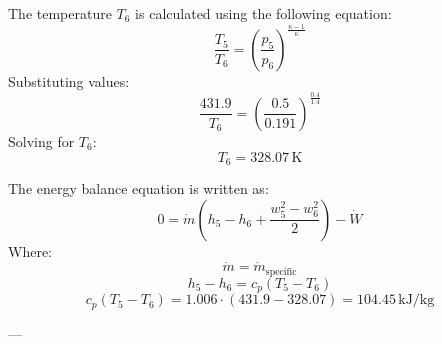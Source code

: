 The temperature \( T_6 \) is calculated using the following equation:  
\[
\frac{T_5}{T_6} = \left( \frac{p_5}{p_6} \right)^{\frac{\kappa - 1}{\kappa}}
\]  
Substituting values:  
\[
\frac{431.9}{T_6} = \left( \frac{0.5}{0.191} \right)^{\frac{0.4}{1.4}}
\]  
Solving for \( T_6 \):  
\[
T_6 = 328.07 \, \text{K}
\]  

The energy balance equation is written as:  
\[
0 = \dot{m} \left( h_5 - h_6 + \frac{w_5^2 - w_6^2}{2} \right) - \dot{W}
\]  
Where:  
\[
\dot{m} = \dot{m}_{\text{specific}}
\]  
\[
h_5 - h_6 = c_p (T_5 - T_6)
\]  
\[
c_p (T_5 - T_6) = 1.006 \cdot (431.9 - 328.07) = 104.45 \, \text{kJ/kg}
\]  

---